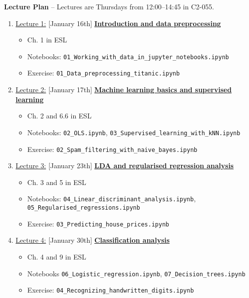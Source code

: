 \documentclass[12pt, a4paper]{article}
\begin{document}
\newpage
\noindent\textbf{\large Lecture Plan}
-- Lectures are Thursdays from 12:00--14:45 in C2-055. \\
\begin{enumerate}
  \item[] \underline{Lecture 1:} [January 16th] \underline{\bf Introduction and data preprocessing}
    {\small
      \begin{itemize}
        \item Ch. 1 in ESL
        \item Notebooks: \texttt{01\_Working\_with\_data\_in\_jupyter\_notebooks.ipynb}
        \item Exercise: \texttt{01\_Data\_preprocessing\_titanic.ipynb}
      \end{itemize}
    }
  \item[] \underline{Lecture 2:} [January 17th] \underline{\bf Machine learning basics and supervised learning}
    {\small
      \begin{itemize}
        \item Ch. 2 and 6.6 in ESL
        \item Notebooks: \texttt{02\_OLS.ipynb}, \texttt{03\_Supervised\_learning\_with\_kNN.ipynb}
        \item Exercise: \texttt{02\_Spam\_filtering\_with\_naive\_bayes.ipynb}
      \end{itemize}
    }
  \item[] \underline{Lecture 3:} [January 23th] \underline{\bf LDA and regularised regression analysis}
    {\small
      \begin{itemize}
        \item Ch. 3 and 5 in ESL
        \item Notebooks: \texttt{04\_Linear\_discriminant\_analysis.ipynb}, \texttt{05\_Regularised\_regressions.ipynb}
        \item Exercise: \texttt{03\_Predicting\_house\_prices.ipynb}
      \end{itemize}
    }
\item [] \underline{Lecture 4:} [January 30th] \underline{\bf Classification analysis}
        {\small
          \begin{itemize}
            \item Ch. 4 and 9 in ESL
            \item Notebooks \texttt{06\_Logistic\_regression.ipynb}, \texttt{07\_Decision\_trees.ipynb}
            \item Exercise: \texttt{04\_Recognizing\_handwritten\_digits.ipynb}

\end{itemize}}
\end{enumerate}
\end{document}
